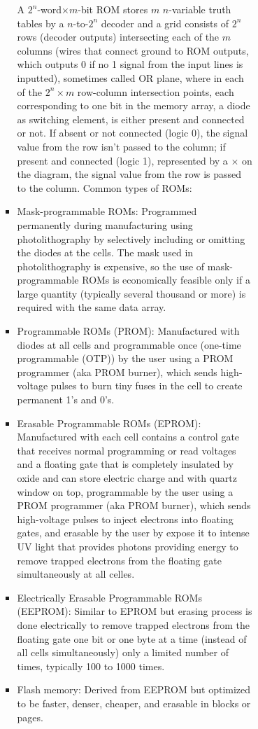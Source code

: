 \documentclass[a4paper,12pt]{article}
\begin{document}
\begin{itemize}
\begin{itemize}
\begin{itemize}
\begin{itemize}
\begin{itemize}
\begin{itemize}
\begin{itemize}
A $2^n$-word$\times m$-bit ROM stores $m$ $n$-variable truth tables by a $n$-to-$2^n$ decoder and a grid consists of $2^n$ rows (decoder outputs) intersecting each of the $m$ columns (wires that connect ground to ROM outputs, which outputs 0 if no 1 signal from the input lines is inputted), sometimes called OR plane, where in each of the $2^n\times m$ row-column intersection points, each corresponding to one bit in the memory array, a diode as switching element, is either present and connected or not. If absent or not connected (logic 0), the signal value from the row isn't passed to the column; if present and connected (logic 1), represented by a $\times$ on the diagram, the signal value from the row is passed to the column.
Common types of ROMs:
\bit
\item Mask-programmable ROMs: Programmed permanently during manufacturing using photolithography by selectively including or omitting the diodes at the cells. The mask used in photolithography is expensive, so the use of mask-programmable ROMs is economically feasible only if a large quantity (typically several thousand or more) is required with the same data array.
\item Programmable ROMs (PROM): Manufactured with diodes at all cells and programmable once (one-time programmable (OTP)) by the user using a PROM programmer (aka PROM burner), which sends high-voltage pulses to burn tiny fuses in the cell to create permanent 1's and 0's.
\item Erasable Programmable ROMs (EPROM): Manufactured with each cell contains a control gate that receives normal programming or read voltages and a floating gate that is completely insulated by oxide and can store electric charge and with quartz window on top, programmable by the user using a PROM programmer (aka PROM burner), which sends high-voltage pulses to inject electrons into floating gates, and erasable by the user by expose it to intense UV light that provides photons providing energy to remove trapped electrons from the floating gate simultaneously at all celles.
\item Electrically Erasable Programmable ROMs (EEPROM): Similar to EPROM but erasing process is done electrically to remove trapped electrons from the floating gate one bit or one byte at a time (instead of all cells simultaneously) only a limited number of times, typically 100 to 1000 times.
\item Flash memory: Derived from EEPROM but optimized to be faster, denser, cheaper, and erasable in blocks or pages.


\end{itemize}
\end{itemize}
\end{itemize}
\end{itemize}
\end{itemize}
\end{itemize}
\end{itemize}
\end{document}
